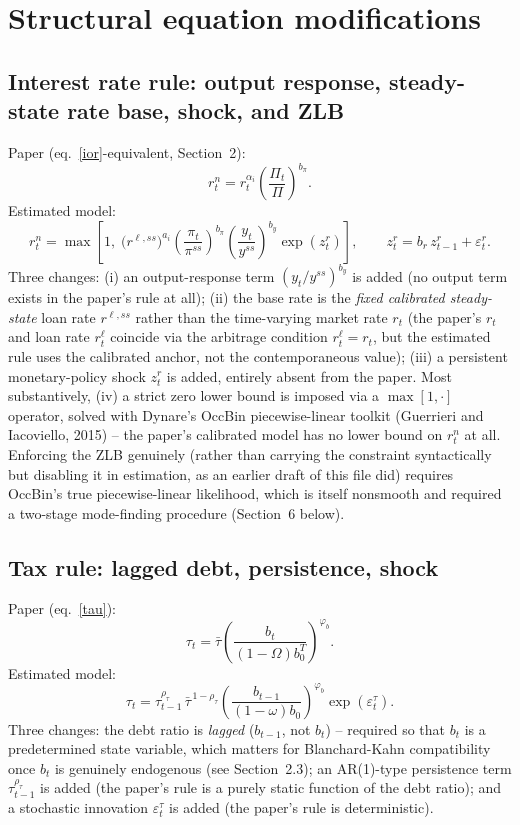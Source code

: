 \documentclass[11pt]{article}
\begin{document}
\section{Structural equation modifications}

\subsection{Interest rate rule: output response, steady-state rate base, shock, and ZLB}
Paper (eq.~\ref{ior}-equivalent, Section~2):
\[
r^{n}_{t}=r_{t}^{\alpha_{i}}\left(\frac{\Pi_{t}}{\Pi}\right)^{b_{\pi}}.
\]
Estimated model:
\[
r^{n}_{t}=\max\!\left[1,\;\big(r^{\ell,ss}\big)^{a_i}\left(\frac{\pi_t}{\pi^{ss}}\right)^{b_\pi}\left(\frac{y_t}{y^{ss}}\right)^{b_y}\exp(z^r_t)\right],
\qquad z^r_t = b_r\,z^r_{t-1}+\varepsilon^r_t.
\]
Three changes: (i) an output-response term $(y_t/y^{ss})^{b_y}$ is added
(no output term exists in the paper's rule at all); (ii) the base rate
is the \emph{fixed calibrated steady-state} loan rate $r^{\ell,ss}$
rather than the time-varying market rate $r_t$ (the paper's $r_t$ and
loan rate $r^\ell_t$ coincide via the arbitrage condition
$r^\ell_t=r_t$, but the estimated rule uses the calibrated anchor, not
the contemporaneous value); (iii) a persistent monetary-policy shock
$z^r_t$ is added, entirely absent from the paper. Most substantively,
(iv) a strict zero lower bound is imposed via a $\max[1,\cdot]$
operator, solved with Dynare's OccBin piecewise-linear toolkit
(Guerrieri and Iacoviello, 2015) -- the paper's calibrated model has no
lower bound on $r^n_t$ at all. Enforcing the ZLB genuinely (rather than
carrying the constraint syntactically but disabling it in estimation,
as an earlier draft of this file did) requires OccBin's true
piecewise-linear likelihood, which is itself nonsmooth and required a
two-stage mode-finding procedure (Section~6 below).

\subsection{Tax rule: lagged debt, persistence, shock}
\label{sec:taxrule}
Paper (eq.~\ref{tau}):
\[
\tau_t = \bar\tau\left(\frac{b_t}{(1-\Omega)b_0^T}\right)^{\varphi_b}.
\]
Estimated model:
\[
\tau_t = \tau_{t-1}^{\rho_\tau}\,\bar\tau^{\,1-\rho_\tau}\left(\frac{b_{t-1}}{(1-\omega)b_0}\right)^{\varphi_b}\exp(\varepsilon^\tau_t).
\]
Three changes: the debt ratio is \emph{lagged} ($b_{t-1}$, not $b_t$)
-- required so that $b_t$ is a predetermined state variable, which
matters for Blanchard-Kahn compatibility once $b_t$ is genuinely
endogenous (see Section~2.3); an AR(1)-type persistence term
$\tau_{t-1}^{\rho_\tau}$ is added (the paper's rule is a purely static
function of the debt ratio); and a stochastic innovation
$\varepsilon^\tau_t$ is added (the paper's rule is deterministic).
\end{document}
